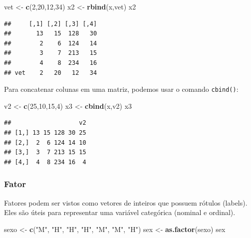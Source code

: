 \documentclass[
]{book}
\newenvironment{Shaded}{\begin{snugshade}}{\end{snugshade}}
\newcommand{\DecValTok}[1]{\textcolor[rgb]{0.00,0.00,0.81}{#1}}
\newcommand{\KeywordTok}[1]{\textcolor[rgb]{0.13,0.29,0.53}{\textbf{#1}}}
\newcommand{\NormalTok}[1]{#1}
\newcommand{\StringTok}[1]{\textcolor[rgb]{0.31,0.60,0.02}{#1}}
\begin{document}
\begin{Shaded}
\begin{Highlighting}[]
\NormalTok{vet <-}\StringTok{ }\KeywordTok{c}\NormalTok{(}\DecValTok{2}\NormalTok{,}\DecValTok{20}\NormalTok{,}\DecValTok{12}\NormalTok{,}\DecValTok{34}\NormalTok{)}
\NormalTok{x2 <-}\StringTok{ }\KeywordTok{rbind}\NormalTok{(x,vet)}
\NormalTok{x2}
\end{Highlighting}
\end{Shaded}

\begin{verbatim}
##     [,1] [,2] [,3] [,4]
##       13   15  128   30
##        2    6  124   14
##        3    7  213   15
##        4    8  234   16
## vet    2   20   12   34
\end{verbatim}

Para concatenar colunas em uma matriz, podemos usar o comando \texttt{cbind()}:

\begin{Shaded}
\begin{Highlighting}[]
\NormalTok{v2 <-}\StringTok{ }\KeywordTok{c}\NormalTok{(}\DecValTok{25}\NormalTok{,}\DecValTok{10}\NormalTok{,}\DecValTok{15}\NormalTok{,}\DecValTok{4}\NormalTok{) }
\NormalTok{x3 <-}\StringTok{ }\KeywordTok{cbind}\NormalTok{(x,v2)}
\NormalTok{x3}
\end{Highlighting}
\end{Shaded}

\begin{verbatim}
##                   v2
## [1,] 13 15 128 30 25
## [2,]  2  6 124 14 10
## [3,]  3  7 213 15 15
## [4,]  4  8 234 16  4
\end{verbatim}

\hypertarget{fator}{%
\subsubsection{Fator}\label{fator}}

Fatores podem ser vistos como vetores de inteiros que possuem rótulos (labels). Eles são úteis para representar uma variável categórica (nominal e ordinal).

\begin{Shaded}
\begin{Highlighting}[]
\NormalTok{sexo <-}\StringTok{ }\KeywordTok{c}\NormalTok{(}\StringTok{"M"}\NormalTok{, }\StringTok{"H"}\NormalTok{, }\StringTok{"H"}\NormalTok{, }\StringTok{"H"}\NormalTok{, }\StringTok{"M"}\NormalTok{, }\StringTok{"M"}\NormalTok{, }\StringTok{"H"}\NormalTok{)}
\NormalTok{sex <-}\StringTok{ }\KeywordTok{as.factor}\NormalTok{(sexo)}
\NormalTok{sex}
\end{Highlighting}
\end{Shaded}
\end{document}
